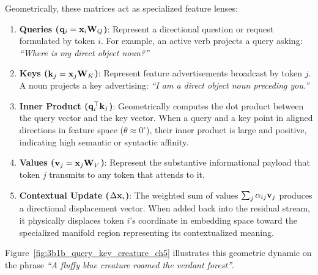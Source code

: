 \documentclass[../../main.tex]{subfiles}
\begin{document}
Geometrically, these matrices act as specialized feature lenses:
\begin{enumerate}
    \item \textbf{Queries ($\mathbf{q}_i = \mathbf{x}_i \mathbf{W}_Q$)}: Represent a directional question or request formulated by token $i$. For example, an active verb projects a query asking: \emph{``Where is my direct object noun?''}
    \item \textbf{Keys ($\mathbf{k}_j = \mathbf{x}_j \mathbf{W}_K$)}: Represent feature advertisements broadcast by token $j$. A noun projects a key advertising: \emph{``I am a direct object noun preceding you.''}
    \item \textbf{Inner Product ($\mathbf{q}_i^\top \mathbf{k}_j$)}: Geometrically computes the dot product between the query vector and the key vector. When a query and a key point in aligned directions in feature space ($\theta \approx 0^\circ$), their inner product is large and positive, indicating high semantic or syntactic affinity.
    \item \textbf{Values ($\mathbf{v}_j = \mathbf{x}_j \mathbf{W}_V$)}: Represent the substantive informational payload that token $j$ transmits to any token that attends to it.
    \item \textbf{Contextual Update ($\Delta \mathbf{x}_i$)}: The weighted sum of values $\sum_j \alpha_{ij} \mathbf{v}_j$ produces a directional displacement vector. When added back into the residual stream, it physically displaces token $i$'s coordinate in embedding space toward the specialized manifold region representing its contextualized meaning.
\end{enumerate}

Figure~\ref{fig:3b1b_query_key_creature_ch5} illustrates this geometric dynamic on the phrase \emph{``A fluffy blue creature roamed the verdant forest''}.
\end{document}
